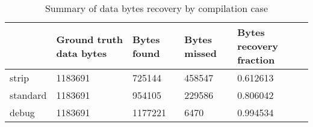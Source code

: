 \begin{table}[t]
\centering
\caption{Summary of data bytes recovery by compilation case}
\label{table:opts-bytes-summary}
\begin{tabular}{lp{4.5cm}p{4.5cm}p{4.5cm}p{4.5cm}}
\toprule
{} &  Ground truth data bytes &  Bytes found &  Bytes missed &  Bytes recovery fraction \\
\midrule
strip    &                  1183691 &       725144 &        458547 &                 0.612613 \\
standard &                  1183691 &       954105 &        229586 &                 0.806042 \\
debug    &                  1183691 &      1177221 &          6470 &                 0.994534 \\
\bottomrule
\end{tabular}
\end{table}
